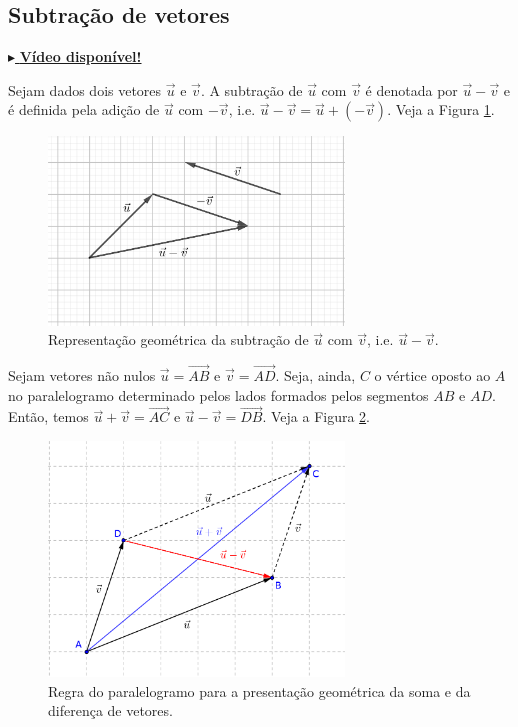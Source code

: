 \subsection{Subtração de vetores}

\begin{flushright}
  \href{https://archive.org/details/subtracao-de-vetores}{$\blacktriangleright$ \bf Vídeo disponível!}
\end{flushright}

Sejam dados dois vetores $\vec{u}$ e $\vec{v}$. A subtração de $\vec{u}$ com $\vec{v}$ é denotada por $\vec{u}-\vec{v}$ e é definida pela adição de $\vec{u}$ com $-\vec{v}$, i.e. $\vec{u}-\vec{v}=\vec{u}+(-\vec{v})$. Veja a Figura \ref{fig:vsubtracao}.

\begin{figure}[H]
  \centering
  \includegraphics[width=0.7\textwidth]{./cap_vetor/dados/fig_vsubtracao/fig_vsubtracao}
  \caption{Representação geométrica da subtração de $\vec{u}$ com $\vec{v}$, i.e. $\vec{u}-\vec{v}$.}
  \label{fig:vsubtracao}
\end{figure}

\begin{obs}
  Sejam vetores não nulos $\vec{u} = \overrightarrow{AB}$ e $\vec{v} = \overrightarrow{AD}$. Seja, ainda, $C$ o vértice oposto ao $A$ no paralelogramo determinado pelos lados formados pelos segmentos $AB$ e $AD$. Então, temos $\vec{u} + \vec{v} = \overrightarrow{AC}$ e $\vec{u}-\vec{v} = \overrightarrow{DB}$. Veja a Figura \ref{fig:regrapara}.

\begin{figure}[H]
  \centering
  \includegraphics[width=0.7\textwidth]{./cap_vetor/dados/fig_regrapara/fig_regrapara}
  \caption{Regra do paralelogramo para a presentação geométrica da soma e da diferença de vetores.}
  \label{fig:regrapara}
\end{figure}  
\end{obs}

